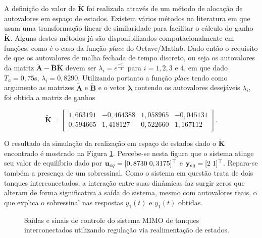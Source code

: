 A definição do valor de $\mathbf{\tilde{K}}$ foi realizada através de um método
de alocação de autovalores em espaço de estados. Existem vários métodos na
literatura em que usam uma transformação linear de similaridade para facilitar o
cálculo do ganho $\mathbf{\tilde{K}}$. Alguns destes métodos já são
disponibilizados computacionalmente em funções, como é o caso da função
\textit{place} do Octave/Matlab. Dado então o requisito de que os autovalores de
malha fechada de tempo discreto, ou seja os autovalores da matriz
$\mathbf{\tilde{A} - \tilde{B}\tilde{K}}$ devem ser $\lambda_i =
e^{\frac{-T_a}{4}}$ para $i = 1, 2, 3$ e $4$, em que dado $T_a = 0,75$s,
$\lambda_i = 0,8290$. Utilizando portanto a função \textit{place} tendo como
argumento as matrizes $\mathbf{\tilde{A}}$ e $\mathbf{\tilde{B}}$ e o vetor
$\mathbf{\lambda}$ contendo os autovalores desejáveis $\lambda_i$, foi obtida a
matriz de ganhos

\begin{equation}
    \label{eq:matriz-de-ganhos-discreto}
    \mathbf{\tilde{K}} = 
    \begin{bmatrix}
        1,663191 & -0,464388 &  1,058965 & -0,045131    \\
        0,594665 &  1,418127 &  0,522660 &  1,167112
    \end{bmatrix}.
\end{equation}

O resultado da simulação da realização em espaço de estados dado o
$\mathbf{\tilde{K}}$ encontrado é mostrado na Figura
\ref{fig:resultado-do-regulador-via-realimentacao-de-estados}. Percebe-se nesta
figura que o sistema atinge seu valor de equilíbrio dado por $\mathbf{u}_{eq} =
[0,8730 \thickspace 0,3175]^\top$ e $\mathbf{y}_{eq} = [2 \thickspace 1]^\top$.
Repara-se também a presença de um sobressinal. Como o sistema em questão trata
de dois tanques interconectados, a interação entre suas dinâmicas faz surgir
zeros que alteram de forma significativa a saída do sistema, mesmo com
autovalores reais, o que explica o sobressinal nas respostas $y_1(t)$ e $y_1(t)$
obtidas.

\begin{figure}[!htp]
    \caption{Saídas e sinais de controle do sistema MIMO de tanques
    interconectados utilizando regulação via realimentação de estados.}
    \vspace{-10pt}
    \hspace{-30pt}
    \label{fig:resultado-do-regulador-via-realimentacao-de-estados}
    \begin{minipage}{\linewidth}
        
    \end{minipage}
\end{figure}

